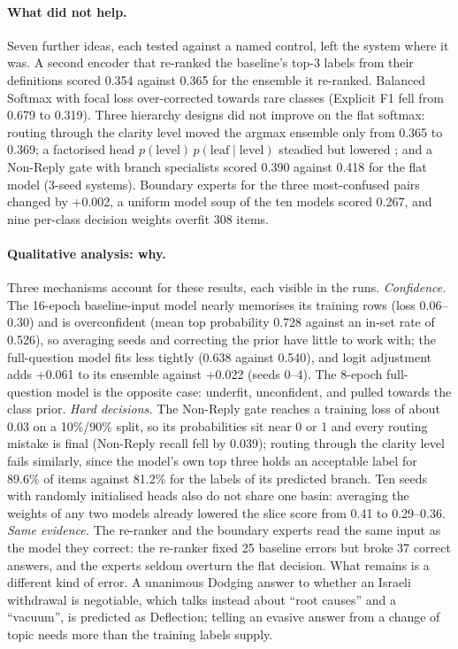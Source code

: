 \paragraph{What did not help.}
Seven further ideas, each tested against a named control, left the system where it was.
A second encoder that re-ranked the baseline's top-3 labels from their definitions scored
0.354 against 0.365 for the ensemble it re-ranked. Balanced Softmax with focal loss
\citep{ren2020balanced,lin2017focal} over-corrected towards rare classes (Explicit F1
fell from 0.679 to 0.319). Three hierarchy designs did not improve on the flat softmax:
routing through the clarity level moved the argmax ensemble only from 0.365 to 0.369; a
factorised head $p(\text{level})\,p(\text{leaf}\mid\text{level})$ steadied \Sone{} but
lowered \Stwo{}; and a Non-Reply gate with branch specialists scored 0.390 against 0.418
for the flat model (3-seed systems). Boundary experts for
the three most-confused pairs changed \Stwo{} by +0.002, a uniform model soup of the ten
models scored 0.267, and nine per-class decision weights overfit 308 items.

\paragraph{Qualitative analysis: why.}
Three mechanisms account for these results, each visible in the runs.
\emph{Confidence.} The 16-epoch baseline-input model nearly memorises its training rows
(loss 0.06--0.30) and is overconfident (mean top probability 0.728 against an in-set rate
of 0.526), so averaging seeds and correcting the prior have little to work with; the
full-question model fits less tightly (0.638 against 0.540), and logit adjustment adds
+0.061 to its ensemble against +0.022 (seeds 0--4). The 8-epoch full-question model is the
opposite case: underfit, unconfident, and pulled towards the class prior.
\emph{Hard decisions.} The Non-Reply gate reaches a training loss of about 0.03 on a
10\%/90\% split, so its probabilities sit near 0 or 1 and every routing mistake is final
(Non-Reply recall fell by 0.039); routing through the clarity level fails similarly, since
the model's own top three holds an acceptable label for 89.6\% of items against 81.2\% for
the labels of its predicted branch. Ten seeds with randomly initialised heads also do not
share one basin: averaging the weights of any two models already lowered the slice score
from 0.41 to 0.29--0.36.
\emph{Same evidence.} The re-ranker and the boundary experts read the same input as the
model they correct: the re-ranker fixed 25 baseline errors but broke 37 correct answers,
and the experts seldom overturn the flat decision. What remains is a different kind of
error. A unanimous Dodging answer to whether an Israeli withdrawal is negotiable, which
talks instead about ``root causes'' and a ``vacuum'', is predicted as Deflection; telling
an evasive answer from a change of topic needs more than the training labels supply.

